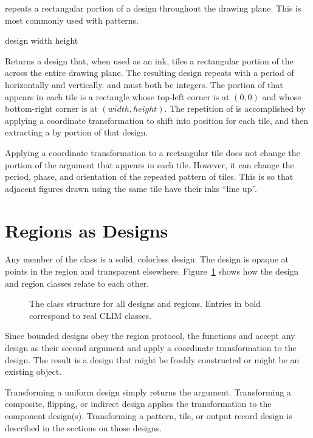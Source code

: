  repeats a rectangular portion of a design throughout the
drawing plane.  This is most commonly used with patterns.

 {design width height}

Returns a design that, when used as an ink, tiles a rectangular portion of the
  across the entire drawing plane.  The resulting
design repeats with a period of  horizontally and 
vertically.   and  must both be integers.  The portion of
 that appears in each tile is a rectangle whose top-left corner is
at $(0,0)$ and whose bottom-right corner is at $(width,height)$.  The repetition
of  is accomplished by applying a coordinate transformation to shift
 into position for each tile, and then extracting a  by
 portion of that design.

Applying a coordinate transformation to a rectangular tile does not change the
portion of the argument  that appears in each tile.  However, it can
change the period, phase, and orientation of the repeated pattern of tiles.
This is so that adjacent figures drawn using the same tile have their inks
``line up''.


\section {Regions as Designs}

Any member of the class  is a solid, colorless design.  The design is
opaque at points in the region and transparent elsewhere.
Figure~\ref{design-classes} shows how the design and region classes relate to
each other.

\begin{figure}
\centerline{}
\caption{\label{design-classes} The class structure for all designs and regions.
Entries in bold correspond to real CLIM classes.}
\end{figure}

Since bounded designs obey the region protocol, the functions
 and  accept any design as their
second argument and apply a coordinate transformation to the design.  The result
is a design that might be freshly constructed or might be an existing object.

Transforming a uniform design simply returns the argument.  Transforming a
composite, flipping, or indirect design applies the transformation to the
component design(s).  Transforming a pattern, tile, or output record design is
described in the sections on those designs.


